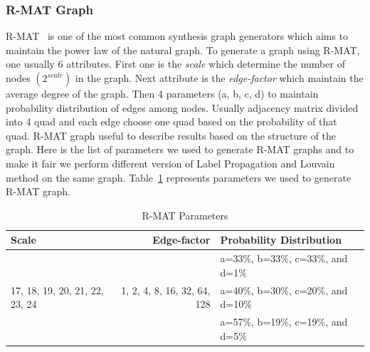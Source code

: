 \documentclass[default,iicol]{sn-jnl}%
\theoremstyle{thmstyleone}%
\theoremstyle{thmstyletwo}%
\theoremstyle{thmstylethree}%
\begin{document}
\subsubsection{R-MAT Graph}
R-MAT~\cite{chakrabarti2004r} is one of the most common synthesis graph generators which aims to maintain 
the power law of the natural graph. To generate a graph using R-MAT, one usually 6 attributes. First one is the 
\textit{scale} which determine the number of nodes $(2^{scale})$ in the graph. Next attribute is the \textit{edge-factor} 
which maintain the average degree of the graph. Then 4 parameters (a, b, c, d) to maintain probability distribution 
of edges among nodes. Usually adjacency matrix divided into 4 quad and each edge choose one quad based on the 
probability of that quad. R-MAT graph useful to describe results based on the structure of the graph. Here is the list 
of parameters we used to generate R-MAT graphs and to make it fair we perform different version of Label Propagation 
and Louvain method on the same graph. Table~\ref{tab:rmat_graph} represents parameters we used to generate 
R-MAT graph. 
\begin{table}[htb]
\caption{R-MAT Parameters}
\label{tab:rmat_graph}
\centering
\begin{tabular}[c]{| l | r | l |}
\hline
Scale & Edge-factor & Probability Distribution\\ \hline
\multirow{3}{*}{17, 18, 19, 20, 21, 22, 23, 24} & \multirow{3}{*}{1, 2, 4, 8, 16, 32, 64, 128} & a=33\%, b=33\%, c=33\%, and d=1\% \\ \cline{3-3}
 &  & a=40\%, b=30\%, c=20\%, and d=10\% \\ \cline{3-3}
 &  & a=57\%, b=19\%, c=19\%, and d=5\% \\ \hline
\end{tabular}
\end{table}
\end{document}
